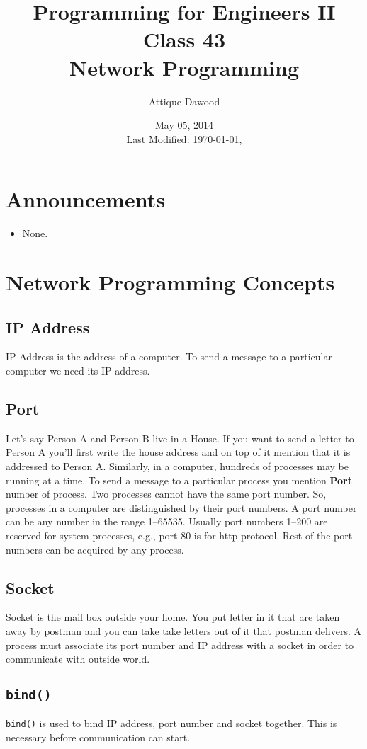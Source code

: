 \documentclass[12pt,a4paper]{article}
\title{\vspace{-2cm}Programming for Engineers II\\Class 43\\Network Programming}
\author{Attique Dawood}
\date{May 05, 2014\\[0.2cm] Last Modified: \today, \currenttime}
\begin{document}
\maketitle
\section{Announcements}
\begin{itemize}
\item None.
\end{itemize}
\section{Network Programming Concepts}
\subsection{IP Address}
IP Address is the address of a computer. To send a message to a particular computer we need its IP address.
\subsection{Port}
Let's say Person A and Person B live in a House. If you want to send a letter to Person A you'll first write the house address and on top of it mention that it is addressed to Person A. Similarly, in a computer, hundreds of processes may be running at a time. To send a message to a particular process you mention \textbf{Port} number of process. Two processes cannot have the same port number. So, processes in a computer are distinguished by their port numbers. A port number can be any number in the range 1--65535. Usually port numbers 1--200 are reserved for system processes, e.g., port 80 is for http protocol. Rest of the port numbers can be acquired by any process.
\subsection{Socket}
Socket is the mail box outside your home. You put letter in it that are taken away by postman and you can take take letters out of it that postman delivers. A process must associate its port number and IP address with a socket in order to communicate with outside world.
\subsection{\texttt{bind()}}
\verb|bind()| is used to bind IP address, port number and socket together. This is necessary before communication can start.
\end{document}
